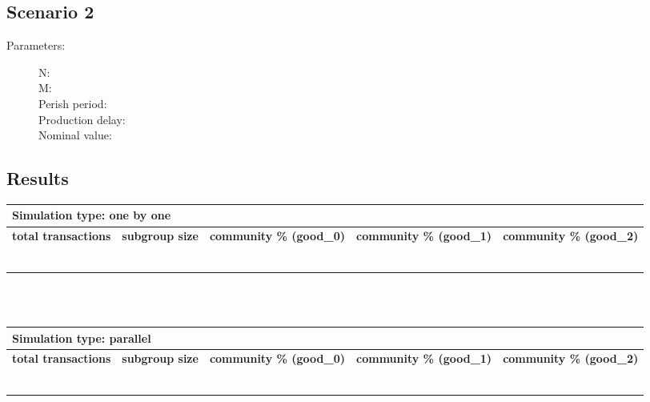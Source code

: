 \documentclass{article}
\begin{document}
\subsection{Scenario 2}
\begin{description}
  \item[Parameters:] \hfill
	\begin{description}
  		\item[N:] 
		\item[M:] 
		\item[Perish period:] 
		\item[Production delay:]
		\item[Nominal value:]
	\end{description}

\end{description}

\subsection{Results}
\begin{tabular}{|  l | c | p{2.5cm} | p{2.5cm} | p{2.5cm} | }
     \multicolumn{5}{l}{\textbf{Simulation type: one by one}} \\ \hline
     \textbf{total transactions} & \textbf{subgroup size} & \textbf{community \% (good\_0)} & \textbf{community \% (good\_1)}  & \textbf{community \% (good\_2)} \\ \hline
     &  & & &  \\ \hline
     &  & & & \\ \hline
     &  & & & \\ \hline
     &  & & &  \\ \hline
     &  & & &  \\ \hline
     &  & & & \\ \hline
\end{tabular}
\\
\\
\begin{tabular}{|  l | c | p{2.5cm} | p{2.5cm} | p{2.5cm} | }
     \multicolumn{5}{l}{\textbf{Simulation type: parallel}} \\ \hline
     \textbf{total transactions} & \textbf{subgroup size} & \textbf{community \% (good\_0)} & \textbf{community \% (good\_1)}  & \textbf{community \% (good\_2)} \\ \hline
     &  & & &  \\ \hline
     &  & & & \\ \hline
     &  & & & \\ \hline
     &  & & &  \\ \hline
     &  & & &  \\ \hline
     &  & & & \\ \hline
\end{tabular}
\end{document}
